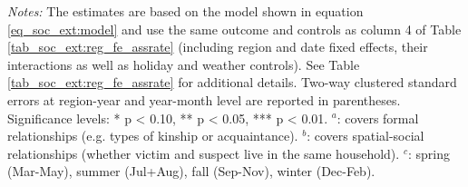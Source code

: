 \begin{table}[t]
\begin{threeparttable}
{\begin{tabular}{l*{6}{c}}
				
				\bottomrule 
		\end{tabular}}
		\begin{tablenotes} 
			\item \scriptsize \emph{Notes:} The estimates are based on the model shown in equation \ref{eq_soc_ext:model} and use the same outcome and controls as column 4 of Table \ref{tab_soc_ext:reg_fe_assrate} (including region and date fixed effects, their interactions as well as holiday and weather controls). See Table \ref{tab_soc_ext:reg_fe_assrate} for additional details. Two-way clustered standard errors at region-year and year-month level are reported in parentheses. \newline Significance levels: * p < 0.10, ** p < 0.05, *** p < 0.01.\newline \hspace*{15pt} $^a$: covers formal relationships (e.g. types of kinship or acquaintance). \newline \hspace*{15pt} $^b$: covers spatial-social relationships (whether victim and suspect live in the same household). \newline \hspace*{15pt} $^c$: spring (Mar-May), summer (Jul+Aug), fall (Sep-Nov), winter (Dec-Feb).
		\end{tablenotes} 
	\end{threeparttable} 
\end{table}




